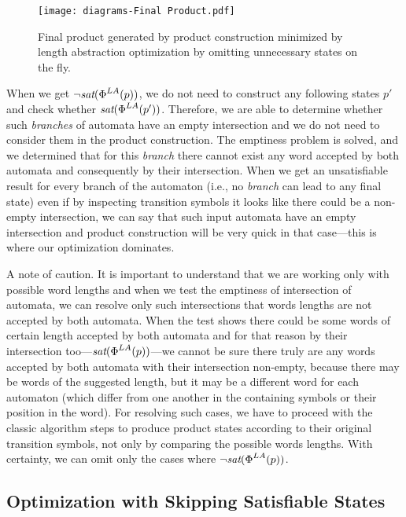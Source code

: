 \begin{figure}[ht]
	\centering
	\texttt{[image: diagrams-Final Product.pdf]}
	\caption{Final product generated by product construction minimized by length abstraction optimization by omitting unnecessary states on the fly.}
	\label{fig:product_final}
\end{figure}


When we get $\neg \emph{sat}(\emph{$\Phi$}^{LA}(p))$, we do not need to construct any following states $p'$ and check whether $\emph{sat}(\emph{$\Phi$}^{LA}(p'))$. Therefore, we are able to determine whether such \textit{branches} of automata have an empty intersection and we do not need to consider them in the product construction. The emptiness problem is solved, and we determined that for this \emph{branch} there cannot exist any word accepted by both automata and consequently by their intersection. When we get an unsatisfiable result for every branch of the automaton (i.e., no \emph{branch} can lead to any final state) even if by inspecting transition symbols it looks like there could be a non-empty intersection, we can say that such input automata have an empty intersection and product construction will be very quick in that case---this is where our optimization dominates.

A note of caution. It is important to understand that we are working only with possible word lengths and when we test the emptiness of intersection of automata, we can resolve only such intersections that words lengths are not accepted by both automata. When the test shows there could be some words of certain length accepted by both automata and for that reason by their intersection too---$\emph{sat}(\emph{$\Phi$}^{LA}(p))$---we cannot be sure there truly are any words accepted by both automata with their intersection non-empty, because there may be words of the suggested length, but it may be a different word for each automaton (which differ from one another in the containing symbols or their position in the word). For resolving such cases, we have to proceed with the classic algorithm steps to produce product states according to their original transition symbols, not only by comparing the possible words lengths. With certainty, we can omit only the cases where $\neg \emph{sat}(\emph{$\Phi$}^{LA}(p))$.


\subsection{Optimization with Skipping Satisfiable States} \label{sec:skipping states}

